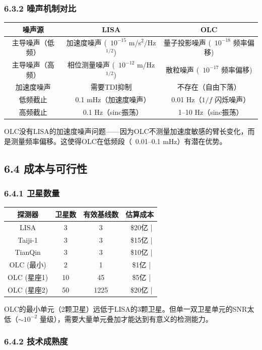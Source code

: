 \documentclass[12pt,a4paper]{article}
\begin{document}
\subsubsection{6.3.2 噪声机制对比}


\begin{tabular}{|c|c|c|}
\hline
噪声源 & LISA & OLC \\
\hline
主导噪声（低频） & 加速度噪声 (~$10^{-15}$ m/s$^2$/Hz$^{1/2}$) & 量子投影噪声 (~$10^{-18}$ 频率偏移) \\
主导噪声（高频） & 相位测量噪声 (~$10^{-12}$ m/Hz$^{1/2}$) & 散粒噪声 (~$10^{-17}$ 频率偏移) \\
加速度噪声 & 需要TDI抑制 & 不存在（自由下落） \\
低频截止 & ~0.1 mHz（加速度噪声） & ~0.01 Hz（$1/f$ 闪烁噪声） \\
高频截止 & ~0.1 Hz（sinc振荡） & ~1–10 Hz（sinc振荡） \\
\hline
\end{tabular}


OLC没有LISA的加速度噪声问题——因为OLC不测量加速度敏感的臂长变化，而是测量频率偏移。这使得OLC在低频段（~0.01–0.1 mHz）有潜在优势。

\subsection{6.4 成本与可行性}


\subsubsection{6.4.1 卫星数量}


\begin{tabular}{|c|c|c|c|}
\hline
探测器 & 卫星数 & 有效基线数 & 估算成本 \\
\hline
LISA & 3 & 3 & ~\$20亿 | \\
Taiji-1 & 3 & 3 & ~\$15亿 | \\
TianQin & 3 & 3 & ~\$10亿 | \\
OLC (最小) & 2 & 1 & ~\$1亿 | \\
OLC (星座1) & 10 & 45 & ~\$5亿 | \\
OLC (星座2) & 50 & 1225 & ~\$20亿 | \\
\hline
\end{tabular}


OLC的最小单元（2颗卫星）远低于LISA的3颗卫星。但单一双卫星单元的SNR太低（$\sim 10^{-2}$ 量级），需要大量单元叠加才能达到有意义的检测能力。

\subsubsection{6.4.2 技术成熟度}
\end{document}
